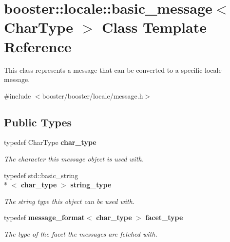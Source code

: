\section{booster\-:\-:locale\-:\-:basic\-\_\-message$<$ Char\-Type $>$ Class Template Reference}
\label{classbooster_1_1locale_1_1basic__message}


This class represents a message that can be converted to a specific locale message.  




{\ttfamily \#include $<$booster/booster/locale/message.\-h$>$}

\subsection*{Public Types}
\begin{DoxyCompactItemize}
\item 
typedef Char\-Type {\bf char\-\_\-type}\label{group__message_ga5cb546ceb92830ddf7ea2913e6651b9e}

\begin{DoxyCompactList}\small\item\em The character this message object is used with. \end{DoxyCompactList}\item 
typedef std\-::basic\-\_\-string\\*
$<$ {\bf char\-\_\-type} $>$ {\bf string\-\_\-type}\label{group__message_ga90b2267af78f4df23fb621e3c1443707}

\begin{DoxyCompactList}\small\item\em The string type this object can be used with. \end{DoxyCompactList}\item 
typedef {\bf message\-\_\-format}$<$ {\bf char\-\_\-type} $>$ {\bf facet\-\_\-type}\label{group__message_ga07188bff8c00be4a1b81323d45525b65}

\begin{DoxyCompactList}\small\item\em The type of the facet the messages are fetched with. \end{DoxyCompactList}\end{DoxyCompactItemize}
